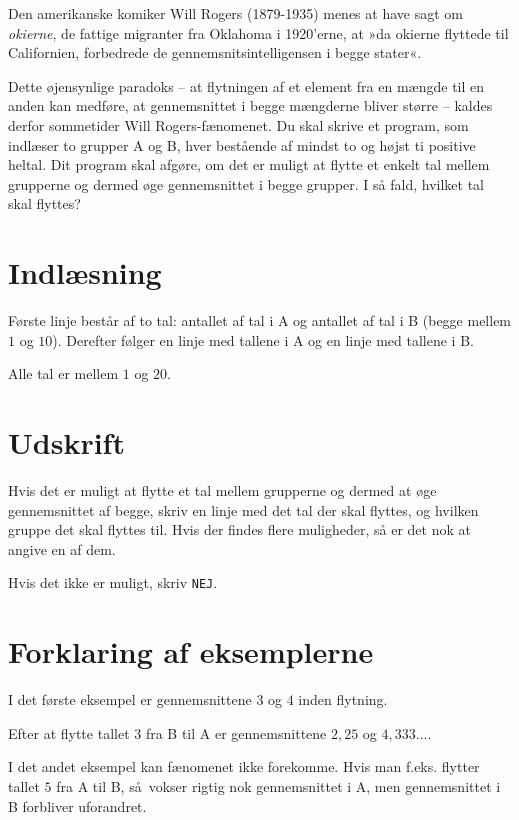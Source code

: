 Den amerikanske komiker Will Rogers (1879-1935) menes at have sagt om \emph{okierne}, de fattige migranter fra Oklahoma i 1920'erne, at »da okierne  flyttede til Californien, forbedrede de gennemsnitsintelligensen i begge stater«.

Dette øjensynlige paradoks -- at flytningen af et element fra en mængde til en anden kan medføre, at gennemsnittet i begge mængderne bliver større -- kaldes derfor sommetider Will Rogers-fænomenet.
Du skal skrive et program, som indlæser to grupper A og B, hver bestående af mindst to og højst ti positive heltal.
Dit program skal afgøre, om det er muligt at flytte et enkelt tal mellem grupperne og dermed øge gennemsnittet i begge grupper.
I så fald, hvilket tal skal flyttes?

\section*{Indlæsning}

Første linje består af to tal: antallet af tal i A og antallet af tal i B (begge mellem $1$ og $10$).
Derefter følger en linje med tallene i A og en linje med tallene i B.

Alle tal er mellem $1$ og $20$.

\section*{Udskrift}
Hvis det er muligt at flytte et tal mellem grupperne og dermed at øge gennemsnittet af begge, skriv en linje med det tal der skal flyttes, og hvilken gruppe det skal flyttes til.
Hvis der findes flere muligheder, så er det nok at angive en af dem.

Hvis det ikke er muligt, skriv \texttt{NEJ}.

\section*{Forklaring af eksemplerne}

I det første eksempel er gennemsnittene $3$ og $4$ inden flytning.

Efter at flytte tallet $3$ fra B til A er gennemsnittene $2{,}25$ og $4{,}333\ldots$.

I det andet eksempel kan fænomenet ikke forekomme.
Hvis man f.eks. flytter tallet $5$ fra A til B, så vokser rigtig nok gennemsnittet i A, men gennemsnittet i B forbliver uforandret. 
